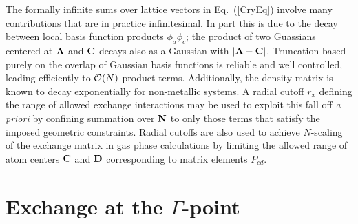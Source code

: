 \documentclass[prb,aps,nobibnotes,twocolumn,doublespace,twocolumngrid,superbib]{revtex4}
\begin{document}
The formally infinite sums over lattice vectors in Eq.~(\ref{CryEq}) involve 
many contributions that are in practice infinitesimal.  In part this is due to 
the decay between local basis function products $\phi_a \phi_c $; the product of
two Guassians centered at ${\bf A}$ and ${\bf C}$ decays also as a Gaussian with 
$|{\bf A}-{\bf C}|$. 
Truncation based purely on the overlap of Gaussian basis functions is reliable and
well controlled, leading efficiently to ${\cal O}(N)$ product terms.
Additionally, the density matrix is known to decay exponentially 
for non-metallic systems.  A radial cutoff $r_x$ defining the range of allowed exchange 
interactions may be used to exploit this fall off {\em a priori} by confining summation over 
${\bf N}$ \cite{REuwema74,CPisani80,RDovesi80,MCausa88} to only those terms that 
satisfy the imposed geometric constraints.  Radial cutoffs are also used to achieve
$N$-scaling of the exchange matrix in gas phase calculations by limiting the allowed range 
of atom centers ${\bf C}$ and ${\bf D}$ corresponding to matrix elements $P_{cd}$\cite{}.  


\section{Exchange at the $\Gamma$-point}\label{gammapoint}
\end{document}
